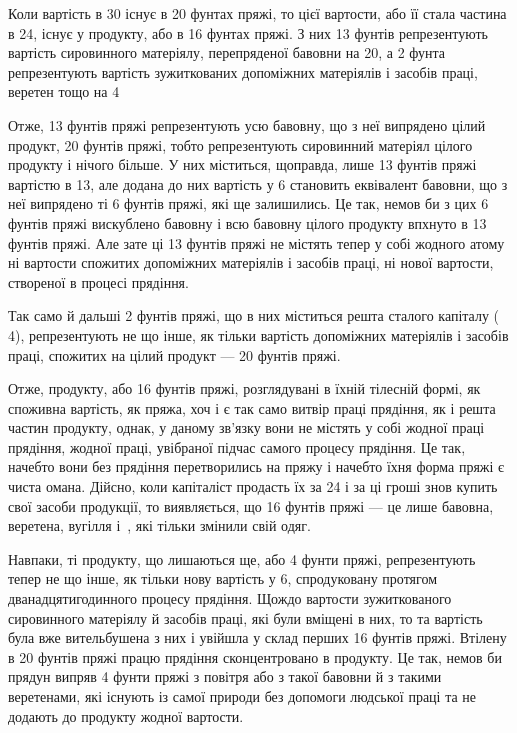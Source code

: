 
Коли вартість в 30 існує в 20 фунтах пряжі, то  цієї вартости, або її стала частина в
24, існує у  продукту, або в 16 фунтах пряжі. З них 13 фунтів репрезентують вартість
сировинного матеріялу, перепряденої бавовни на 20, а 2 фунта репрезентують вартість
зужиткованих допоміжних матеріялів і засобів праці, веретен тощо на 4

Отже, 13 фунтів пряжі репрезентують усю бавовну, що з неї випрядено цілий продукт, 20 фунтів
пряжі, тобто репрезентують сировинний матеріял цілого продукту і нічого більше. У них міститься,
щоправда, лише 13 фунтів пряжі вартістю в 13, але додана до них вартість у 6 становить еквівалент бавовни, що з неї випрядено ті 6 фунтів пряжі, які ще залишились.
Це так, немов би з цих 6 фунтів пряжі вискублено бавовну і всю бавовну цілого продукту впхнуто в
13 фунтів пряжі. Але зате ці 13 фунтів пряжі не містять тепер у собі жодного атому ні
вартости спожитих допоміжних матеріялів і засобів праці, ні нової вартости, створеної в процесі
прядіння.

Так само й дальші 2 фунтів пряжі, що в них міститься решта сталого капіталу (\deq{} 4),
репрезентують не що інше, як
тільки вартість допоміжних матеріялів і засобів праці, спожитих на цілий продукт — 20 фунтів пряжі.

Отже,  продукту, або 16 фунтів пряжі, розглядувані в їхній тілесній формі, як споживна вартість,
як пряжа, хоч і
є так само витвір праці прядіння, як і решта частин продукту, однак, у даному зв’язку вони не
містять у собі жодної праці прядіння, жодної праці, увібраної підчас самого процесу прядіння. Це
так, начебто вони без прядіння перетворились на пряжу і начебто їхня форма пряжі є чиста омана.
Дійсно, коли капіталіст продасть їх за 24 і за ці гроші знов купить свої засоби продукції,
то виявляється, що 16 фунтів пряжі — це лише бавовна, веретена, вугілля і~, які тільки змінили
свій одяг.

Навпаки, ті  продукту, що лишаються ще, або 4 фунти пряжі, репрезентують тепер не що інше, як
тільки нову вартість
у 6, спродуковану протягом дванадцятигодинного процесу прядіння. Щождо вартости
зужиткованого сировинного матеріялу й засобів праці, які були вміщені в них, то та вартість була вже
вительбушена з них і увійшла у склад перших 16 фунтів пряжі. Втілену в 20 фунтів пряжі працю
прядіння сконцентровано
в  продукту. Це так, немов би прядун випряв 4 фунти пряжі з повітря або з такої бавовни й з
такими веретенами, які
існують із самої природи без допомоги людської праці та не додають до продукту жодної вартости.
